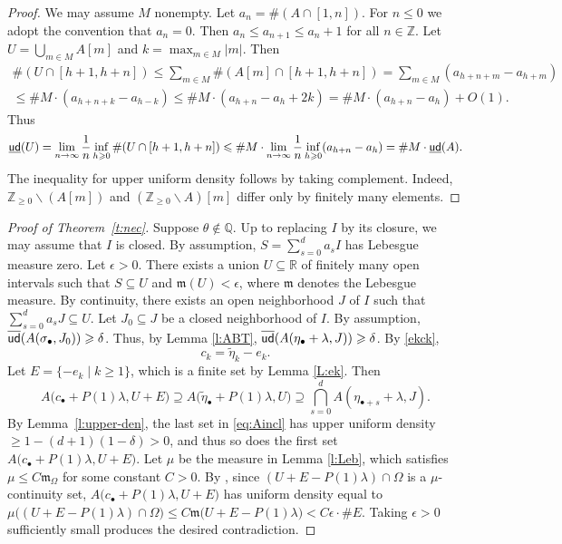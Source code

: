 \documentclass[12pt,centertags,oneside]{amsart}
\theoremstyle{definition}
\newcommand{\mleb}{\mathfrak{m}}
\newcommand{\R}{\mathbb{R}}
\newcommand{\Z}{\mathbb{Z}}
\newcommand{\lden}{\underline{\sf ud}}
\newcommand{\uden}{\overline{\sf ud}}
\renewcommand{\le}{\leqslant}
\renewcommand{\ge}{\geqslant}
\begin{document}
\begin{proof}
We may assume $M$ nonempty. Let $a_n=\#( A\cap [1,n])$. For $n\le 0$ we 
adopt the convention that $a_n=0$. Then $a_n\le a_{n+1}\le a_n+1$ for all 
$n\in \Z$. Let $U=\bigcup_{m\in M}A[m]$ and $k=\max_{m\in M} \lvert 
m\rvert$. Then 
\begin{multline*}
\#(U\cap 
[h+1,h+n])\le \sum_{m\in M}\#(A[m]\cap[h+1,h+n])=\sum_{m\in M}(a_{h+n+m}-a_{h+m})\\\le \#M\cdot (a_{h+n+k}-a_{h-k})\le \#M\cdot 
(a_{h+n}-a_h+2k)=\#M\cdot (a_{h+n}-a_h) +O(1).
\end{multline*}
Thus 
\[\lden(U)=\lim_{n\to \infty} \frac{1}{n}\inf_{h\ge 0}\#(U\cap 
[h+1,h+n])\le\#M\cdot \lim_{n\to \infty}\frac{1}{n}\inf_{h\ge 0} (a_{h+n}-a_h)=\#M\cdot \lden(A).
\] 
The inequality for upper uniform density follows by taking complement. 
Indeed, $\Z_{\ge 0}\backslash (A[m])$ and $(\Z_{\ge 0}\backslash A)[m]$ 
differ only by finitely many elements. 
\end{proof} 

\begin{proof}[Proof of Theorem~\ref{t:nec}] 
Suppose $\theta\notin\mathbb{Q}$. Up to replacing $I$ by its closure, we 
may assume that $I$ is closed. By assumption, $S=\sum_{s=0}^d a_s I$ has 
Lebesgue measure zero. Let $\epsilon>0$. There exists a union $U\subseteq 
\R$ of finitely many open intervals such that $S\subseteq U$ and 
$\mleb(U)<\epsilon$, where $\mleb$ denotes the Lebesgue measure. By 
continuity, there exists an open neighborhood $J$ of $I$ such that 
$\sum_{s=0}^d a_s J\subseteq U$. Let $J_0\subseteq J$ be a closed 
neighborhood of $I$. By assumption, $\uden(A(\sigma_\bullet, J_0)) \ge 
\delta$. Thus, by Lemma \ref{l:ABT}, $\uden(A(\eta_\bullet+\lambda, J)) \ge 
\delta$. By \eqref{ekck}, 
\[
c_k=\tilde{\eta}_{k}-e_{k}.
\]
Let $E=\{-e_{k}\mid k\ge 1\}$, which is a finite set by Lemma \ref{L:ek}. 
Then 
\begin{equation}\label{eq:Aincl}
A\big(c_\bullet+P(1)\lambda,U+E\big)\supseteq A\big(\tilde{\eta}_\bullet+P(1)\lambda,U\big)\supseteq \bigcap_{s=0}^d A(\eta_{\bullet+s}+\lambda,J).
\end{equation}
By Lemma~\ref{l:upper-den}, the last set in \eqref{eq:Aincl} has upper 
uniform density $\ge1-(d+1)(1-\delta)>0$, and thus so does the first set 
$A\big(c_\bullet+P(1)\lambda,U+E\big)$. Let $\mu$ be the measure in Lemma 
\ref{l:Leb}, which satisfies $\mu\le C\mleb_\Omega$ for some constant 
$C>0$. By \cite[Chapter 3, Corollary 3.2]{KN}, since $(U+E-P(1)\lambda)\cap 
\Omega$ is a $\mu$-continuity set, $A\big(c_\bullet+P(1)\lambda,U+E\big)$ 
has uniform density equal to $\mu\big((U+E-P(1)\lambda)\cap \Omega\big)\le 
C\mleb\big(U+E-P(1)\lambda\big)< C \epsilon \cdot \# E$. Taking 
$\epsilon>0$ sufficiently small produces the desired contradiction. 
\end{proof} 
\end{document}
